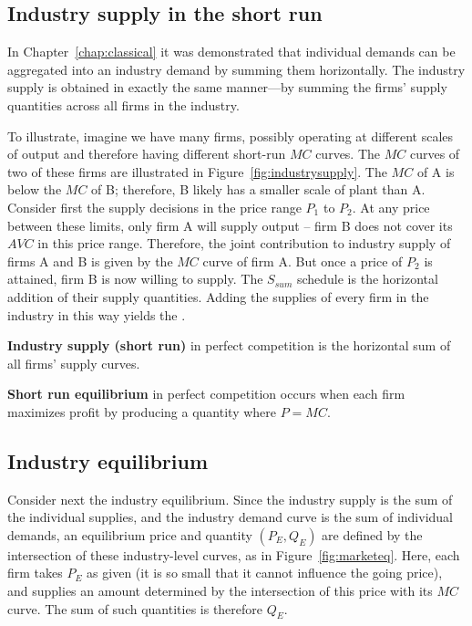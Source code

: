 \subsection*{Industry supply in the short run}

In Chapter~\ref{chap:classical} it was demonstrated that individual demands can be aggregated into an industry demand by summing them horizontally. The industry supply is obtained in exactly the same manner---by summing the firms' supply quantities across all firms in the industry. 

To illustrate, imagine we have many firms, possibly operating at different scales of output and therefore having different short-run $MC$ curves. The $MC$ curves of two of these firms are illustrated in Figure~\ref{fig:industrysupply}. The $MC$ of A is below the $MC$ of B; therefore, B likely has a smaller scale of plant than A. Consider first the supply decisions in the price range $P_1$ to $P_2$. At any price between these limits, only firm A will supply output -- firm B does not cover its $AVC$ in this price range. Therefore, the joint contribution to industry supply of firms A and B is given by the $MC$ curve of firm A. But once a price of $P_2$ is attained, firm B is now willing to supply. The $S_{sum}$ schedule is the horizontal addition of their supply quantities. Adding the supplies of every firm in the industry in this way yields the .



\begin{DefBox}
\textbf{Industry supply (short run)} in perfect competition is the horizontal sum of all firms' supply curves.

\textbf{Short run equilibrium} in perfect competition occurs when each firm maximizes profit by producing a quantity where $P=MC$.
\end{DefBox}

\subsection*{Industry equilibrium}

Consider next the industry equilibrium. Since the industry supply is the sum of the individual supplies, and the industry demand curve is the sum of individual demands, an equilibrium price and quantity $(P_E,Q_E)$ are defined by the intersection of these industry-level curves, as in Figure~\ref{fig:marketeq}. Here, each firm takes $P_E$ as given (it is so small that it cannot influence the going price), and supplies an amount determined by the intersection of this price with its $MC$ curve. The sum of such quantities is therefore $Q_E$.

